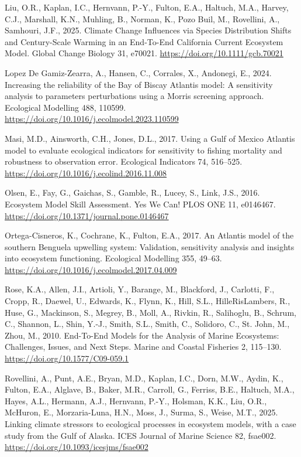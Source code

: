\documentclass[
]{article}
\newlength{\cslhangindent}
\newenvironment{CSLReferences}[2] %
 {\begin{list}{}{%
  \setlength{\itemindent}{0pt}
  \setlength{\leftmargin}{0pt}
  \setlength{\parsep}{0pt}
  \ifodd #1
   \setlength{\leftmargin}{\cslhangindent}
   \setlength{\itemindent}{-1\cslhangindent}
  \fi
  \setlength{\itemsep}{#2\baselineskip}}}
 {\end{list}}
\begin{document}
\begin{CSLReferences}{1}{0}
Liu, O.R., Kaplan, I.C., Hernvann, P.-Y., Fulton, E.A., Haltuch, M.A., Harvey, C.J., Marshall, K.N., Muhling, B., Norman, K., Pozo Buil, M., Rovellini, A., Samhouri, J.F., 2025. Climate {Change Influences} via {Species Distribution Shifts} and {Century}-{Scale Warming} in an {End}-{To}-{End California Current Ecosystem Model}. Global Change Biology 31, e70021. \url{https://doi.org/10.1111/gcb.70021}

Lopez De Gamiz-Zearra, A., Hansen, C., Corrales, X., Andonegi, E., 2024. Increasing the reliability of the {Bay} of {Biscay Atlantis} model: {A} sensitivity analysis to parameters perturbations using a {Morris} screening approach. Ecological Modelling 488, 110599. \url{https://doi.org/10.1016/j.ecolmodel.2023.110599}

Masi, M.D., Ainsworth, C.H., Jones, D.L., 2017. Using a {Gulf} of {Mexico Atlantis} model to evaluate ecological indicators for sensitivity to fishing mortality and robustness to observation error. Ecological Indicators 74, 516--525. \url{https://doi.org/10.1016/j.ecolind.2016.11.008}

Olsen, E., Fay, G., Gaichas, S., Gamble, R., Lucey, S., Link, J.S., 2016. Ecosystem {Model Skill Assessment}. {Yes We Can}! PLOS ONE 11, e0146467. \url{https://doi.org/10.1371/journal.pone.0146467}

Ortega-Cisneros, K., Cochrane, K., Fulton, E.A., 2017. An {Atlantis} model of the southern {Benguela} upwelling system: {Validation}, sensitivity analysis and insights into ecosystem functioning. Ecological Modelling 355, 49--63. \url{https://doi.org/10.1016/j.ecolmodel.2017.04.009}

Rose, K.A., Allen, J.I., Artioli, Y., Barange, M., Blackford, J., Carlotti, F., Cropp, R., Daewel, U., Edwards, K., Flynn, K., Hill, S.L., HilleRisLambers, R., Huse, G., Mackinson, S., Megrey, B., Moll, A., Rivkin, R., Salihoglu, B., Schrum, C., Shannon, L., Shin, Y.-J., Smith, S.L., Smith, C., Solidoro, C., St. John, M., Zhou, M., 2010. End-{To-End Models} for the {Analysis} of {Marine Ecosystems}: {Challenges}, {Issues}, and {Next Steps}. Marine and Coastal Fisheries 2, 115--130. \url{https://doi.org/10.1577/C09-059.1}

Rovellini, A., Punt, A.E., Bryan, M.D., Kaplan, I.C., Dorn, M.W., Aydin, K., Fulton, E.A., Alglave, B., Baker, M.R., Carroll, G., Ferriss, B.E., Haltuch, M.A., Hayes, A.L., Hermann, A.J., Hernvann, P.-Y., Holsman, K.K., Liu, O.R., McHuron, E., Morzaria-Luna, H.N., Moss, J., Surma, S., Weise, M.T., 2025. Linking climate stressors to ecological processes in ecosystem models, with a case study from the {Gulf} of {Alaska}. ICES Journal of Marine Science 82, fsae002. \url{https://doi.org/10.1093/icesjms/fsae002}


\end{CSLReferences}
\end{document}
